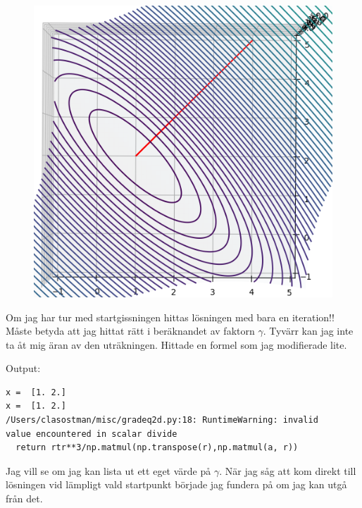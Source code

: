 \documentclass{article}
\begin{document}
\newpage
\begin{figure}
    \includegraphics[width=\textwidth]{exempel_2.png}
\end{figure}
Om jag har tur med startgissningen hittas lösningen med bara en iteration!! 
Måste betyda att jag hittat rätt i beräknandet av faktorn $\gamma$.
Tyvärr kan jag inte ta åt mig äran av den uträkningen. Hittade en formel
som jag modifierade lite.

Output:
\begin{verbatim}
x =  [1. 2.]
x =  [1. 2.]
/Users/clasostman/misc/gradeq2d.py:18: RuntimeWarning: invalid 
value encountered in scalar divide
  return rtr**3/np.matmul(np.transpose(r),np.matmul(a, r))
\end{verbatim}
\newpage
Jag vill se om jag kan lista ut ett eget värde på $\gamma$. När jag såg att kom direkt
till lösningen vid lämpligt vald startpunkt började jag fundera på om jag kan utgå från det.
\end{document}
